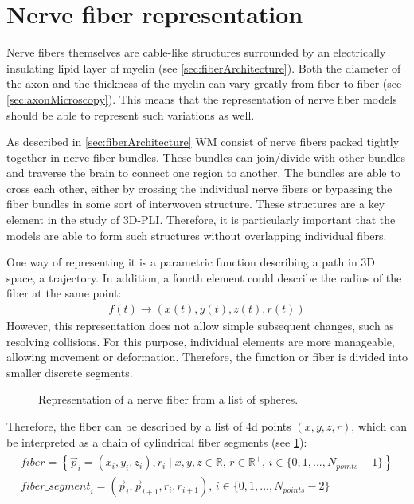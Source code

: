 \section{Nerve fiber representation}
\label{sec:nerve_fiber_representation}
%
Nerve fibers themselves are cable-like structures surrounded by an electrically insulating lipid layer of myelin (see \cref{sec:fiberArchitecture}).
Both the diameter of the axon and the thickness of the myelin can vary greatly from fiber to fiber (see \cref{sec:axonMicroscopy}).
This means that the representation of nerve fiber models should be able to represent such variations as well.
\par
%
As described in \cref{sec:fiberArchitecture} \ac{WM} consist of nerve fibers packed tightly together in nerve fiber bundles.
These bundles can join/divide with other bundles and traverse the brain to connect one region to another.
The bundles are able to cross each other, either by crossing the individual nerve fibers or bypassing the fiber bundles in some sort of interwoven structure.
These structures are a key element in the study of \ac{3D-PLI}.
Therefore, it is particularly important that the models are able to form such structures without overlapping individual fibers.
\par
%
One way of representing it is a parametric function describing a path in 3D space, a trajectory.
In addition, a fourth element could describe the radius of the fiber at the same point:
% 
\begin{align}
f(t) \rightarrow (x(t),y(t), z(t), r(t))
\end{align}
% 
However, this representation does not allow simple subsequent changes, such as resolving collisions.
For this purpose, individual elements are more manageable, allowing movement or deformation.
Therefore, the function or fiber is divided into smaller discrete segments.
%
\begin{figure}[!t]
    \setlength{\tikzwidth}{0.85\textwidth}
    \centering
	\caption[]{Representation of a nerve fiber from a list of spheres.}
	\label{fig:fiberReb}
\end{figure}
%
Therefore, the fiber can be described by a list of 4d points $(x,y,z,r)$, which can be interpreted as a chain of cylindrical fiber segments (see \cref{fig:fiberReb}):
\begin{align}
\begin{split}
\mathit{fiber} = \left\{ \vec{p}_i=(x_i,y_i,z_i), r_i \mid x,y,z \in \mathbb{R}, \, r \in \mathbb{R^+}, \, i \in \{0,1,...,N_{\mathit{points}}-1\}\right\} \\
\mathit{fiber\_segment}_i = (\vec{p}_i, \vec{p}_{i+1}, r_i, r_{i+1}), \, i \in \{0,1,...,N_{\mathit{points}}-2\}
\end{split}
\end{align}
